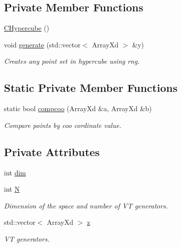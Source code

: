 \subsection*{Private Member Functions}
\begin{DoxyCompactItemize}
\item 
\hyperlink{class_c_hypercube_a0b290cec3556dfd71b96925505806e49}{C\-Hypercube} ()
\item 
void \hyperlink{class_c_hypercube_ae9e96413f19e3104a3a2d1bfb1d6dbc2}{generate} (std\-::vector$<$ Array\-Xd $>$ \&y)
\begin{DoxyCompactList}\small\item\em Creates any point set in hypercube using rng. \end{DoxyCompactList}\end{DoxyCompactItemize}
\subsection*{Static Private Member Functions}
\begin{DoxyCompactItemize}
\item 
static bool \hyperlink{class_c_hypercube_a712a63c77227ecef7e3707c0d5887f3a}{compcoo} (Array\-Xd \&a, Array\-Xd \&b)
\begin{DoxyCompactList}\small\item\em Compare points by coo cordinate value. \end{DoxyCompactList}\end{DoxyCompactItemize}
\subsection*{Private Attributes}
\begin{DoxyCompactItemize}
\item 
int \hyperlink{class_c_hypercube_aa46e76296cb1f00d6bbf237de95b943e}{dim}
\item 
int \hyperlink{class_c_hypercube_a5ae7a70b21a9969219f150498c7e9cf3}{N}
\begin{DoxyCompactList}\small\item\em Dimension of the space and number of V\-T generators. \end{DoxyCompactList}\item 
std\-::vector$<$ Array\-Xd $>$ \hyperlink{class_c_hypercube_ae50abfa68524ad94ba198dcf08cb6389}{z}
\begin{DoxyCompactList}\small\item\em V\-T generators. \end{DoxyCompactList}\end{DoxyCompactItemize}
